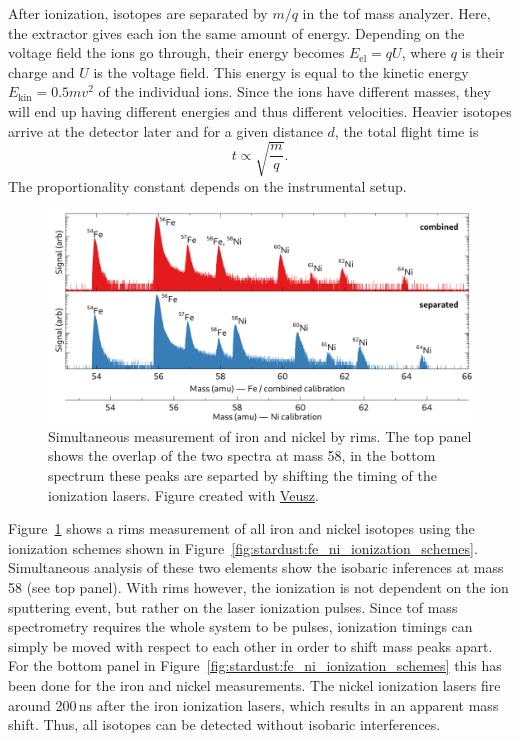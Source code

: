After ionization, isotopes are separated by $m/q$ in the \ac{tof} mass analyzer. Here, the extractor gives each ion the same amount of energy. Depending on the voltage field the ions go through, their energy becomes $E_\mathrm{el} = q U$, where $q$ is their charge and $U$ is the voltage field. This energy is equal to the kinetic energy $E_\mathrm{kin} = 0.5 m v^2$ of the individual ions. Since the ions have different masses, they will end up having different energies and thus different velocities. Heavier isotopes arrive at the detector later and for a given distance $d$, the total flight time is 
\begin{equation}
    t \propto \sqrt{\frac{m}{q}}.
\end{equation}
The proportionality constant depends on the instrumental setup. 

\begin{figure}[tb]
    \centering
    \includegraphics[width=\textwidth]{graphics/stardust/feni_ms}
    \caption{Simultaneous measurement of iron and nickel by \ac{rims}. The top panel shows the overlap of the two spectra at mass 58, in the bottom spectrum these peaks are separted by shifting the timing of the ionization lasers. Figure created with \href{https://veusz.github.io}{Veusz}.}
    \label{fig:stardust:fe_ni_rims_ms}
\end{figure}
Figure~\ref{fig:stardust:fe_ni_rims_ms} shows a \ac{rims} measurement of all iron and nickel isotopes using the ionization schemes shown in Figure~\ref{fig:stardust:fe_ni_ionization_schemes}. Simultaneous analysis of these two elements show the isobaric inferences at mass 58 (see top panel). With \ac{rims} however, the ionization is not dependent on the ion sputtering event, but rather on the laser ionization pulses. Since \ac{tof} mass spectrometry requires the whole system to be pulses, ionization timings can simply be moved with respect to each other in order to shift mass peaks apart. For the bottom panel in Figure~\ref{fig:stardust:fe_ni_ionization_schemes} this has been done for the iron and nickel measurements. The nickel ionization lasers fire around 200\,ns after the iron ionization lasers, which results in an apparent mass shift. Thus, all isotopes can be detected without isobaric interferences. 

